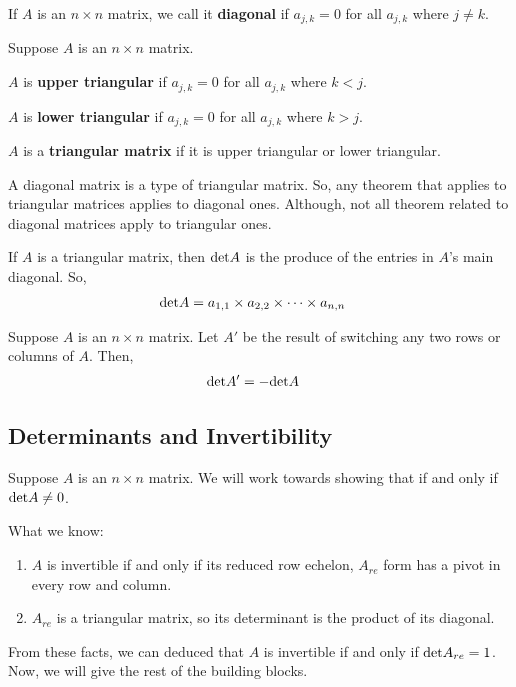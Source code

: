 \begin{definition}
    If $A$ is an $n \times n$ matrix, we call it \textbf{diagonal} if $a_{j,k} = 0$ for all $a_{j,k}$ where $j \neq k$.
\end{definition}
\begin{definition}
    Suppose $A$ is an $n \times n$ matrix. 

    $A$ is \textbf{upper triangular} if $a_{j,k} = 0$ for all $a_{j,k}$ where $k < j$.
    
    $A$ is \textbf{lower triangular} if $a_{j,k} = 0$ for all $a_{j,k}$ where $k > j$.

    $A$ is a \textbf{triangular matrix} if it is upper triangular or lower triangular.
\end{definition}

\begin{remark}
    A diagonal matrix is a type of triangular matrix. So, any theorem that applies to triangular matrices applies to diagonal ones. Although, not
    all theorem related to diagonal matrices apply to triangular ones.
\end{remark}

\begin{thm}
    If $A$ is a triangular matrix, then $\text{det} A$ is the produce of the entries in $A$'s main diagonal. So,
    \begin{align*}
        \text{det} A &= a_{1,1} \times a_{2,2} \times \cdots \times a_{n, n} 
    \end{align*}
\end{thm}

\begin{thm}
    Suppose $A$ is an $n \times n$ matrix. Let $A'$ be the result of switching any two rows or columns of $A$. Then,
    \begin{align*}
        \text{det} A' &= - \text{det} A
    \end{align*} 
\end{thm}

\subsection{Determinants and Invertibility}

\begin{setup}
    Suppose $A$ is an $n \times n$ matrix. We will work towards showing that if and only if $\text{det} A \neq 0$.
    
    What we know:
    \begin{enumerate}
        \item $A$ is invertible if and only if its reduced row echelon, $A_{re}$ form has a pivot in every row and column.
        \item $A_{re}$ is a triangular matrix, so its determinant is the product of its diagonal.
    \end{enumerate}

    From these facts, we can deduced that $A$ is invertible if and only if $\text{det} A_{re} = 1$. Now, we will give the rest of the building blocks.
\end{setup}

